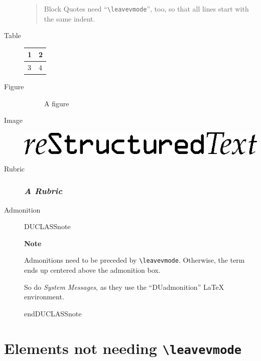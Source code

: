 \documentclass[a4paper]{article}
\newlength{\DUtablewidth} %
\newenvironment{DUclass}[1]%
  {%
   \def\DocutilsClassFunctionName{DUCLASS#1}
     \csname \DocutilsClassFunctionName \endcsname}%
  {\csname end\DocutilsClassFunctionName \endcsname}%
\newenvironment{DUadmonition}%
  {\begin{center}
     \begin{lrbox}{\DUadmonitionbox}
       \begin{minipage}{0.9\linewidth}
  }%
  {    \end{minipage}
     \end{lrbox}
     \fbox{\usebox{\DUadmonitionbox}}
   \end{center}
  }
\providecommand*{\DUrubric}[1]{\subsubsection*{\emph{#1}}}
\providecommand*{\DUtitle}[1]{%
  \smallskip\noindent\textbf{#1}\smallskip}
\begin{document}
\begin{description}
\begin{quote}
Block Quotes need “\texttt{\textbackslash{}leavevmode}”, too,
so that all lines start with the same indent.
\end{quote}

\item[{Table}] \leavevmode
\setlength{\DUtablewidth}{\linewidth}%
\begin{longtable*}{|p{0.051\DUtablewidth}|p{0.051\DUtablewidth}|}
\hline

1
 & 
2
 \\
\hline

3
 & 
4
 \\
\hline
\end{longtable*}

\item[{Figure}] \leavevmode
\begin{figure}
\noindent{}
\caption{A figure}
\end{figure}

\item[{Image}] \leavevmode

\includegraphics{../../../docs/user/rst/images/title.png}

\item[{Rubric}] \leavevmode
\DUrubric{A Rubric}

\item[{Admonition}] \leavevmode
\begin{DUclass}{note}
\begin{DUadmonition}
\DUtitle{Note}

Admonitions need to be preceded by \texttt{\textbackslash{}leavevmode}.
Otherwise, the term ends up centered above the admonition box.

So do \emph{System Messages}, as they use the “DUadmonition”
LaTeX environment.
\end{DUadmonition}
\end{DUclass}
\end{description}


\section{Elements not needing \texttt{\textbackslash{}leavevmode}%
  \label{elements-not-needing-leavevmode}%
}
\end{document}
